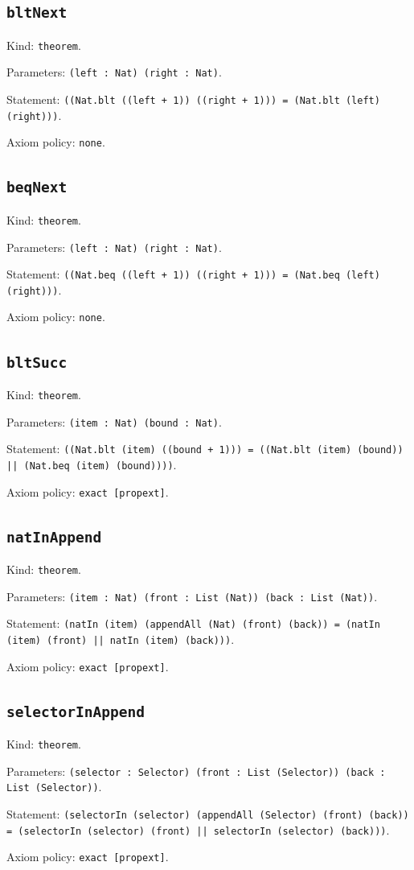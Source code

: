 \documentclass[11pt]{article}
\begin{document}
\subsection*{\texttt{bltNext}}
\noindent Kind: \texttt{theorem}.\par
\noindent Parameters: \texttt{(left : Nat) (right : Nat)}.\par
\noindent Statement: \texttt{((Nat.blt ((left + 1)) ((right + 1))) = (Nat.blt (left) (right)))}.\par
\noindent Axiom policy: \texttt{none}.\par
\subsection*{\texttt{beqNext}}
\noindent Kind: \texttt{theorem}.\par
\noindent Parameters: \texttt{(left : Nat) (right : Nat)}.\par
\noindent Statement: \texttt{((Nat.beq ((left + 1)) ((right + 1))) = (Nat.beq (left) (right)))}.\par
\noindent Axiom policy: \texttt{none}.\par
\subsection*{\texttt{bltSucc}}
\noindent Kind: \texttt{theorem}.\par
\noindent Parameters: \texttt{(item : Nat) (bound : Nat)}.\par
\noindent Statement: \texttt{((Nat.blt (item) ((bound + 1))) = ((Nat.blt (item) (bound)) || (Nat.beq (item) (bound))))}.\par
\noindent Axiom policy: \texttt{exact [propext]}.\par
\subsection*{\texttt{natInAppend}}
\noindent Kind: \texttt{theorem}.\par
\noindent Parameters: \texttt{(item : Nat) (front : List (Nat)) (back : List (Nat))}.\par
\noindent Statement: \texttt{(natIn (item) (appendAll (Nat) (front) (back)) = (natIn (item) (front) || natIn (item) (back)))}.\par
\noindent Axiom policy: \texttt{exact [propext]}.\par
\subsection*{\texttt{selectorInAppend}}
\noindent Kind: \texttt{theorem}.\par
\noindent Parameters: \texttt{(selector : Selector) (front : List (Selector)) (back : List (Selector))}.\par
\noindent Statement: \texttt{(selectorIn (selector) (appendAll (Selector) (front) (back)) = (selectorIn (selector) (front) || selectorIn (selector) (back)))}.\par
\noindent Axiom policy: \texttt{exact [propext]}.\par
\end{document}
